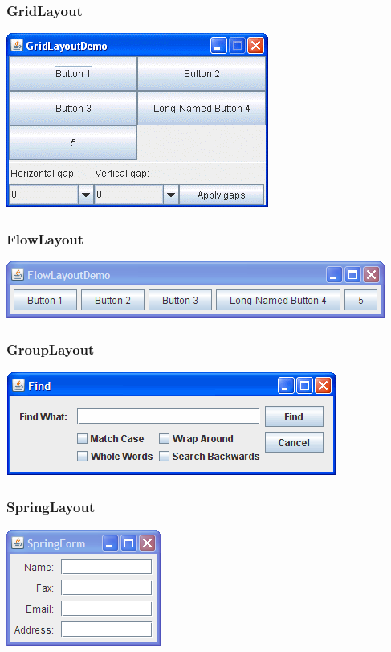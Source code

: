 \begin{frame}[fragile]
	\frametitle{GridLayout}
	\includegraphics[scale=1]{GridLayoutDemo.png}
\end{frame}

\begin{frame}[fragile]
	\frametitle{FlowLayout}
	\includegraphics[scale=0.8]{FlowLayoutDemo.png}
\end{frame}

\begin{frame}[fragile]
	\frametitle{GroupLayout}
	\includegraphics[scale=1]{find.png}
\end{frame}

\begin{frame}[fragile]
	\frametitle{SpringLayout}
	\includegraphics[scale=1]{SpringForm.png}
\end{frame}


